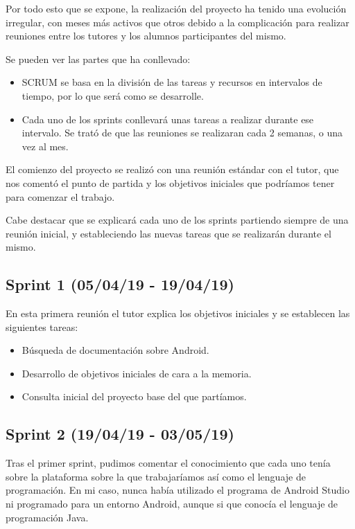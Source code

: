 Por todo esto que se expone, la realización del proyecto ha tenido una evolución irregular, con meses más activos que otros debido a la complicación para realizar reuniones entre los tutores y los alumnos participantes del mismo.

Se pueden ver las partes que ha conllevado:

\begin{itemize}

\item SCRUM se basa en la división de las tareas y recursos en intervalos de tiempo, por lo que será como se desarrolle. 

\item Cada uno de los sprints conllevará unas tareas a realizar durante ese intervalo. Se trató de que las reuniones se realizaran cada 2 semanas, o una vez al mes.

\end{itemize}

El comienzo del proyecto se realizó con una reunión estándar con el tutor, que nos comentó el punto de partida y los objetivos iniciales que podríamos tener para comenzar el trabajo.

Cabe destacar que se explicará cada uno de los sprints partiendo siempre de una reunión inicial, y estableciendo las nuevas tareas que se realizarán durante el mismo.

\subsection{Sprint 1 (05/04/19 - 19/04/19)}

En esta primera reunión el tutor explica los objetivos iniciales y se establecen las siguientes tareas:

\begin{itemize}
\item Búsqueda de documentación sobre Android.
\item Desarrollo de objetivos iniciales de cara a la memoria.
\item Consulta inicial del proyecto base del que partíamos.
\end{itemize}

\subsection{Sprint 2 (19/04/19 - 03/05/19)}

Tras el primer sprint, pudimos comentar el conocimiento que cada uno tenía sobre la plataforma sobre la que trabajaríamos así como el lenguaje de programación. En mi caso, nunca había utilizado el programa de Android Studio ni programado para un entorno Android, aunque si que conocía el lenguaje de programación Java.

